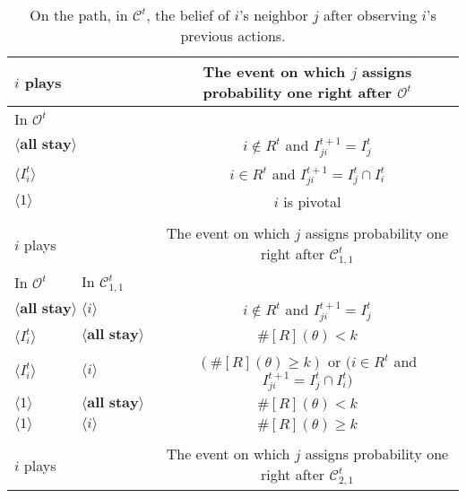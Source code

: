 \documentclass[12pt,letter]{article}
\newcommand{\Kappa}{\mathcal{C}}
\newcommand{\Omicron}{\mathcal{O}}
\theoremstyle{definition}
\theoremstyle{remark}
\theoremstyle{claim}
\begin{document}
\begin{table}[!htbp]
\caption{On the path,  in $\Kappa^t$, the belief of $i$'s neighbor $j$ after observing $i$'s previous actions.}
\label{Table_blf_cdt}
\begin{center}
\begin{tabular}{l l l | c}
 $i$ plays  	&&	&	 The event on which $j$ assigns probability one right after $\Omicron^t$\\
\hline
\hline
 In $\Omicron^t$		&&&					 \\
\hline
$\langle \textbf{all stay} \rangle$  &&&     $i\notin R^t$ and $I^{t+1}_{ji}=I^t_j$ \\
$\langle I^t_{i} \rangle$  &&&     $i\in R^t$ and $I^{t+1}_{ji}=I^t_j\cap I^t_{i}$ \\
$\langle 1 \rangle$  &&& 	  $i$ is pivotal    \\
\hline
\\
 $i$ plays	&&			  & The event on which $j$ assigns probability one right after $\Kappa^t_{1,1}$\\
\hline
\hline
	  In $\Omicron^t$	 	&		In $\Kappa^t_{1,1}$	&		&		  \\
\hline
$\langle \textbf{all stay} \rangle$  & $\langle i \rangle$	&&    $i\notin R^t$ and $I^{t+1}_{ji}=I^t_j$  \\
$\langle I^t_{i} \rangle$  & $\langle \textbf{all stay} \rangle$	&&    $\#[R](\theta)< k$ \\
$\langle I^t_{i} \rangle$  & $\langle i \rangle$	&&   $(\#[R](\theta)\geq k )$ or $(i\in R^t$ and $I^{t+1}_{ji}=I^t_j\cap I^t_{i})$\\
$\langle 1 \rangle$  & $\langle \textbf{all stay} \rangle$	&&	  $\#[R](\theta)< k$    \\
$\langle 1 \rangle$  & $\langle i \rangle$	&&	  $\#[R](\theta)\geq k$  \\
\hline
\\
 $i$ plays  	&		&  	  &The event on which $j$ assigns probability one right after $\Kappa^t_{2,1}$\\

\end{tabular}
\end{center}
\end{table}
\end{document}
